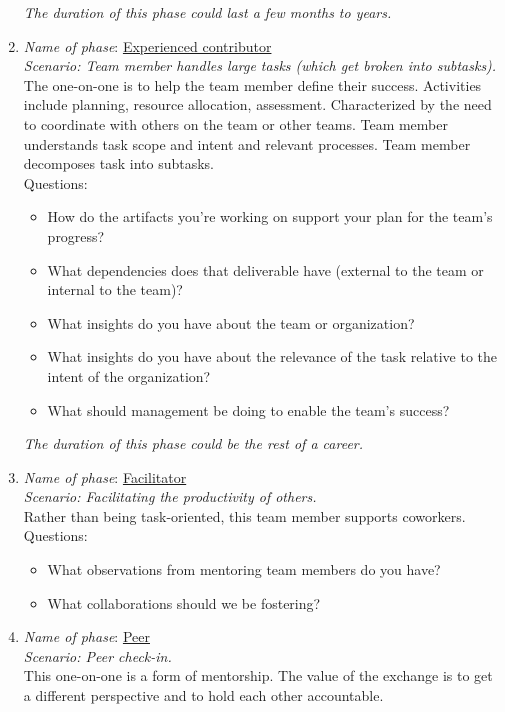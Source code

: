 \begin{enumerate}
\textit{The duration of this phase could last a few months to years.}
    \item \textit{Name of phase}: \underline{Experienced contributor}\\
    \textit{Scenario: Team member handles large tasks (which get broken into subtasks). }\\
    The one-on-one is to help the team member define their success. Activities include planning, resource allocation, assessment. Characterized by the need to coordinate with others on the team or other teams. Team member understands task scope and intent and relevant processes. Team member decomposes task into subtasks.\\
    Questions:
    \begin{itemize}
        \item How do the artifacts you're working on support your plan for the team's progress?
        \item What dependencies does that deliverable have (external to the team or internal to the team)?
        \item What insights do you have about the team or organization?
        \item What insights do you have about the relevance of the task relative to the intent of the organization?
        \item What should management be doing to enable the team's success?
    \end{itemize}
\textit{The duration of this phase could be the rest of a career.}
    \item \textit{Name of phase}: \underline{Facilitator}\\
    \textit{Scenario: Facilitating the productivity of others.}\\
    Rather than being task-oriented, this team member supports coworkers. \\
    Questions:
    \begin{itemize}
        \item What observations from mentoring team members do you have?
        \item What collaborations should we be fostering?
    \end{itemize}
    \item \textit{Name of phase}: \underline{Peer}\\
    \textit{Scenario: Peer check-in.}\\ 
    This one-on-one is a form of mentorship. The value of the exchange is to get a different perspective and to hold each other accountable.
\end{enumerate}

